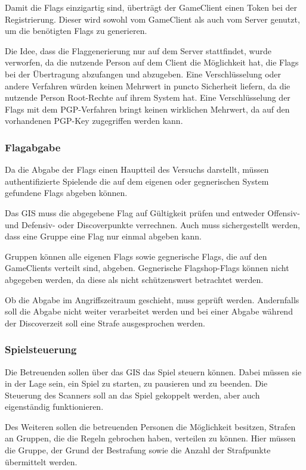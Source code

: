 Damit die Flags einzigartig sind, überträgt der GameClient einen Token bei der Registrierung. Dieser wird sowohl vom GameClient als auch vom Server genutzt, um die benötigten Flags zu generieren.

Die Idee, dass die Flaggenerierung nur auf dem Server stattfindet, wurde verworfen, da die nutzende Person auf dem Client die Möglichkeit hat, die Flags bei der Übertragung abzufangen und abzugeben. Eine Verschlüsselung oder andere Verfahren würden keinen Mehrwert in puncto Sicherheit liefern, da die nutzende Person Root-Rechte auf ihrem System hat. Eine Verschlüsselung der Flags mit dem PGP-Verfahren bringt keinen wirklichen Mehrwert, da auf den vorhandenen PGP-Key zugegriffen werden kann. 

\subsubsection{Flagabgabe}

Da die Abgabe der Flags einen Hauptteil des Versuchs darstellt, müssen authentifizierte Spielende die auf dem eigenen oder gegnerischen System gefundene Flags abgeben können.

Das GIS muss die abgegebene Flag auf Gültigkeit prüfen und entweder Offensiv- und \linebreak
Defensiv- oder Discoverpunkte verrechnen. Auch muss sichergestellt werden, dass eine Gruppe eine Flag nur einmal abgeben kann.

Gruppen können alle eigenen Flags sowie gegnerische Flags, die auf den GameClients verteilt sind, abgeben. Gegnerische Flagshop-Flags können nicht abgegeben werden, da diese als nicht schützenswert betrachtet werden.

Ob die Abgabe im Angriffszeitraum geschieht, muss geprüft werden. Andernfalls soll die Abgabe nicht weiter verarbeitet werden und bei einer Abgabe während der Discoverzeit soll eine Strafe ausgesprochen werden.


\subsubsection{Spielsteuerung}

Die Betreuenden sollen über das GIS das Spiel steuern können. Dabei müssen sie in der Lage sein, ein Spiel zu starten, zu pausieren und zu beenden. Die Steuerung des Scanners soll an das Spiel gekoppelt werden, aber auch eigenständig funktionieren.

Des Weiteren sollen die betreuenden Personen die Möglichkeit besitzen, Strafen an Gruppen, die die Regeln gebrochen haben, verteilen zu können. Hier müssen die Gruppe, der Grund der Bestrafung sowie die Anzahl der Strafpunkte übermittelt werden.

